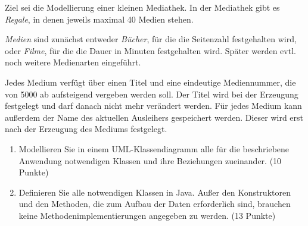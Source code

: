 Ziel sei die Modellierung einer kleinen Mediathek. In der Mediathek gibt es \emph{Regale}, in denen jeweils maximal 40 Medien stehen.

\emph{Medien} sind zunächst entweder \emph{Bücher}, für die die Seitenzahl festgehalten wird, oder \emph{Filme}, für die die Dauer in Minuten festgehalten wird. Später werden evtl. noch weitere Medienarten eingeführt.

Jedes Medium verfügt über einen Titel und eine eindeutige Mediennummer, die von 5000 ab aufsteigend vergeben werden soll. Der Titel wird bei der Erzeugung festgelegt und darf danach nicht mehr verändert werden. Für jedes Medium kann außerdem der Name des aktuellen Ausleihers gespeichert werden. Dieser wird erst nach der Erzeugung des Mediums festgelegt.
\begin{enumerate}[label=\alph*)]
\item Modellieren Sie in einem UML-Klassendiagramm alle für die beschriebene Anwendung notwendigen Klassen und ihre Beziehungen zueinander. \textcolor{diagramm}{(10 Punkte)}
\item Definieren Sie alle notwendigen Klassen in Java. Außer den Konstruktoren und den Methoden, die zum Aufbau der Daten erforderlich sind, brauchen keine Methodenimplementierungen angegeben zu werden. \textcolor{diagramm}{(13 Punkte)}
\end{enumerate}

